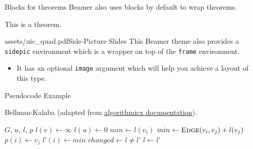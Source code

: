 \documentclass{beamer}
\newcommand{\hrefcol}[2]{\textcolor{uihteal}{\href{#1}{#2}}}
\begin{document}
\begin{frame}{Blocks for theorems}
Beamer also uses blocks by default to wrap theorems.
\begin{theorem} This is a theorem. \end{theorem}
\end{frame}


\begin{sidepic}{assets/uic_quad.pdf}{Side-Picture Slides}
This Beamer theme also provides a \texttt{sidepic} environment which is a wrapper on top of the \texttt{frame} environment.
\begin{itemize}
\item It has an optional \texttt{image} argument which will help you achieve a layout of this type.
\end{itemize}
\end{sidepic}


\renewcommand{\algorithmicrequire}{\textbf{Input:}}
\renewcommand{\algorithmicensure}{\textbf{Output:}}

\footlinecolor{}

\begin{frame}{Pseudocode Example}
\begin{algorithm}[H]
\fontsize{8}{1}\selectfont
\caption{Bellman-Kalaba (adapted from \hrefcol{https://www.ctan.org/tex-archive/macros/latex/contrib/algorithmicx/algorithmicx.pdf}{algorithmicx documentation}).}
\begin{algorithmic}
\Require $G$, $u$, $l$, $p$
    \State $l(v) \leftarrow \infty$
\EndFor
\State $l(u) \leftarrow 0$
\Repeat
        \State $min \leftarrow l(v_i)$
                \State $min \leftarrow \Call{Edge}{v_i, v_j} + l(v_j)$ 
                \State $p(i) \leftarrow v_j$
            \EndIf
        \EndFor
        \State $l’(i) \leftarrow min$
    \EndFor
    \State $changed \leftarrow l \not= l’$
    \State $l \leftarrow l’$
\end{algorithmic}
\end{algorithm}
\end{frame}


\end{document}
